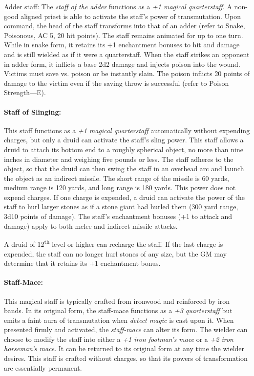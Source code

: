 \begin{multicols}{2}
\underline{Adder staff:} The \textit{staff of the adder} functions as a \textit{+1 magical quarterstaff}.  A non-good aligned priest is able to activate the staff's power of transmutation.  Upon command, the head of the staff transforms into that of an adder (refer to Snake, Poisonous, AC 5, 20 hit points).  The staff remains animated for up to one turn.  While in snake form, it retains its +1 enchantment bonuses to hit and damage and is still wielded as if it were a quarterstaff.  When the staff strikes an opponent in adder form, it inflicts a base 2d2 damage and injects poison into the wound.  Victims must save vs. poison or be instantly slain.  The poison inflicts 20 points of damage to the victim even if the saving throw is successful (refer to Poison Strength---E).  

\paragraph{Staff of Slinging:} This staff functions as a \textit{+1 magical quarterstaff} automatically without expending charges, but only a druid can activate the staff's sling power.  This staff allows a druid to attach its bottom end to a roughly spherical object, no more than nine inches in diameter and weighing five pounds or less.  The staff adheres to the object, so that the druid can then swing the staff in an overhead arc and launch the object as an indirect missile.  The short range of the missile is 60 yards, medium range is 120 yards, and long range is 180 yards.  This power does not expend charges.  If one charge is expended, a druid can activate the power of the staff to hurl larger stones as if a stone giant had hurled them (300 yard range, 3d10 points of damage).  The staff's enchantment bonuses (+1 to attack and damage) apply to both melee and indirect missile attacks.

A druid of 12\textsuperscript{th} level or higher can recharge the staff.  If the last charge is expended, the staff can no longer hurl stones of any size, but the GM may determine that it retains its +1 enchantment bonus.

\paragraph{Staff-Mace:} This magical staff is typically crafted from ironwood and reinforced by iron bands.  In its original form, the staff-mace functions as a \textit{+3 quarterstaff} but emits a faint aura of transmutation when \textit{detect magic} is cast upon it.  When presented firmly and activated, the \textit{staff-mace} can alter its form.  The wielder can choose to modify the staff into either a \textit{+1 iron footman's mace} or a \textit{+2 iron horseman's mace}.  It can be returned to its original form at any time the wielder desires.  This staff is crafted without charges, so that its powers of transformation are essentially permanent.


\end{multicols}
